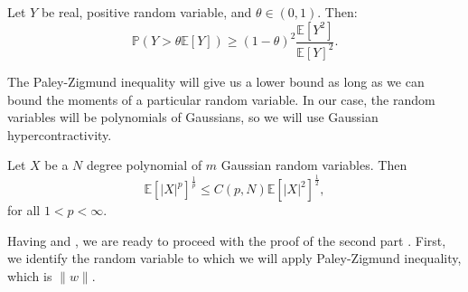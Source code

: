 \documentclass[]{article}
\numberwithin{equation}{section}
\theoremstyle{definition}
\newcommand{\EE}{\mathbb{E}}
\begin{document}
\begin{lemma}
Let $Y$ be real, positive random variable, and $\theta \in (0,1)$. Then: 
\begin{equation}
    \mathbb{P} \left ( Y > \theta \EE [Y]\right ) \geq (1-\theta) ^{2} \dfrac{\EE[Y^2]}{\EE[Y]^{2}} . 
\end{equation}
\label{lemma:paley_zigmund}
\end{lemma}
The Paley-Zigmund inequality will give us a lower bound as long as we can bound the moments of a particular random variable. In our case, the random variables will be polynomials of Gaussians, so we will use Gaussian hypercontractivity. 
\begin{lemma} Let $X$ be a $N$ degree polynomial of $m$ Gaussian random variables. Then  
\[
\EE \left [ |X|^{p}\right ]^{\frac{1}{p}} \leq C(p,N) \EE \left [ |X|^{2}\right]^{\frac{1}{2}},
\]
for all $1 < p < \infty$. 
\label{lemma:gaussian_hypercontractivity_alignment}
\end{lemma}

Having  and , we are ready to proceed with the proof of the second part . First, we identify the random variable to which we will apply Paley-Zigmund inequality, which is $\|w \|$. 
\end{document}
